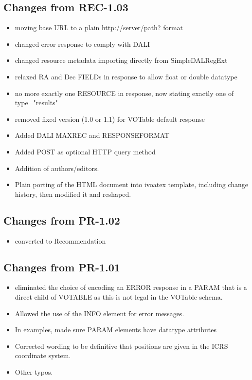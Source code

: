 \documentclass[11pt,a4paper]{ivoa}
\begin{document}
\subsection*{Changes from REC-1.03}
\label{appendix:first11changes}
\begin{itemize}
	\item moving base URL to a plain http://server/path? format
	\item changed error response to comply with DALI
	\item changed resource metadata importing directly from SimpleDALRegExt
	\item relaxed RA and Dec FIELDs in response to allow float or double datatype
	\item no more exactly one RESOURCE in response, now stating exactly one of
		type="results"
	\item removed fixed version (1.0 or 1.1) for VOTable default response
	\item Added DALI MAXREC and RESPONSEFORMAT
	\item Added POST as optional HTTP query method
	\item Addition of authors/editors.
	\item Plain porting of the HTML document into ivoatex template,
		including change history, then modified it and reshaped.
\end{itemize}

\subsection*{Changes from PR-1.02}
\begin{itemize}
	\item converted to Recommendation
\end{itemize}

\subsection*{Changes from PR-1.01}
\begin{itemize}
	\item eliminated the
		choice of encoding an ERROR response in a PARAM that is a direct child
		of VOTABLE as this is not legal in the VOTable schema.
	\item Allowed the use of the INFO element for error messages.
	\item In examples, made sure PARAM elements have datatype attributes
	\item Corrected wording to be definitive that positions are given 
		in the ICRS coordinate system.
	\item Other typos.
\end{itemize}
\end{document}

